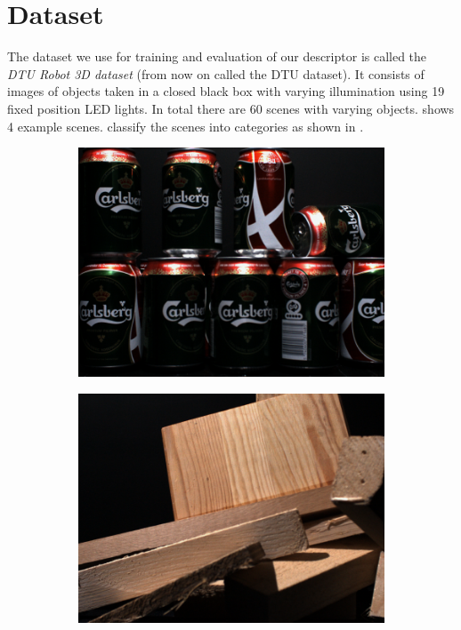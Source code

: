 \documentclass[thesis.tex]{subfiles}
\begin{document}
\section{Dataset}
The dataset we use for training and evaluation of our descriptor is called the \emph{DTU Robot 3D dataset} \cite{aanaes2010recall} (from now on called the DTU dataset). It consists of images of objects taken in a closed black box with varying illumination using 19 fixed position LED lights. In total there are 60 scenes with varying objects.  shows 4 example scenes. \citet{aanaes2010ground} classify the scenes into categories as shown in .

\begin{figure}[tb]
	\centering
	\begin{subfigure}{0.49\textwidth}
		\includegraphics[width=\textwidth]{img/dtu_example_1.png}
	\end{subfigure}
	\hfill
	\begin{subfigure}{0.49\textwidth}
		\includegraphics[width=\textwidth]{img/dtu_example_2.png}

\end{subfigure}
\end{figure}
\end{document}
